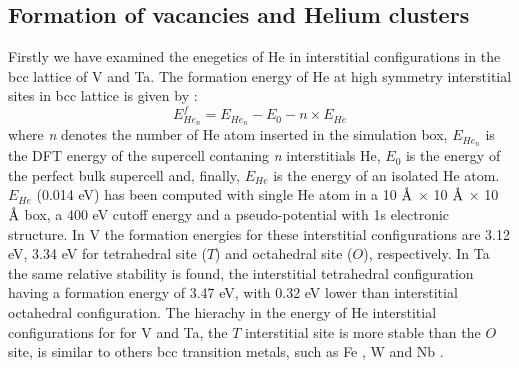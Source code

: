 \documentclass[a4,12pt,showpacs,preprintnumbers,amsmath,amssymb]{revtex4}
\newcommand{\angstrom}{\text{\normalfont\AA}}
\begin{document}
\subsection{Formation of vacancies and Helium clusters}\label{formation}

Firstly we have examined the enegetics of He in interstitial configurations in the bcc lattice of V and Ta.  
%
The formation energy of He at high symmetry interstitial sites in bcc lattice is given by : 
 \begin{equation}
  E_{He_n}^f = E_{He_n} - E_0 - n \times E_{He}
 \end{equation}
where \textit{n} denotes the number of He atom inserted in the simulation box, $E_{He_n}$ is the DFT energy 
of the supercell contaning \textit{n} interstitials He, 
$E_0$ is the energy of the perfect bulk supercell and, finally,  
%
$E_{He}$ is the energy of an isolated He atom.
$E_{He}$ (0.014 eV) has been computed with single He atom in 
a 10 $\angstrom$  $\times$ 10 $\angstrom$ $\times$ 10 $\angstrom$ box, a 400 eV cutoff energy and a pseudo-potential with 1s electronic structure.
%
In V the formation energies for these interstitial configurations are 3.12 eV, 3.34 eV for 
tetrahedral site ($T$) and octahedral site ($O$), respectively. 
%
In Ta the same relative stability is found,  the interstitial tetrahedral 
configuration having a formation energy of 3.47 eV, with 0.32 eV lower than interstitial octahedral configuration. 
%
The hierachy in the energy of He interstitial configurations for for V and Ta,
the $T$ interstitial site is more stable than the $O$ site, is similar to others bcc 
transition metals, such as Fe \cite{Fu2005}, W and Nb \cite{seletskaia2008}.
\end{document}
